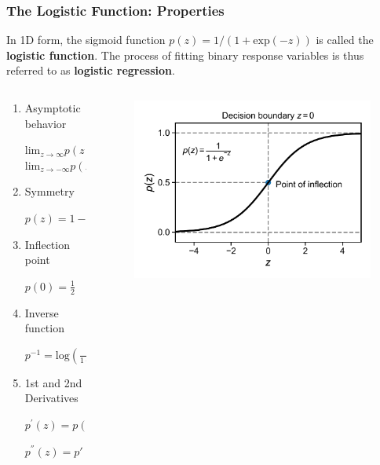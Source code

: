 \documentclass[10pt,aspectratio=169]{beamer}
\begin{document}
\begin{frame}
  \frametitle{The Logistic Function: Properties}
  
  In 1D form, the sigmoid function $p(z) = 1/(1 + \mathrm{exp}(-z))$ is called
  the \textbf{logistic function}. The process of fitting binary
  response variables is thus referred to as \textbf{logistic
    regression}.

    \begin{columns}[T]
      \begin{column}{0.5\textwidth}
        \begin{enumerate}
        \item Asymptotic behavior
          
          $\mathrm{lim}_{z\to\infty} p(z) = 1$ $\mathrm{lim}_{z\to-\infty} p(z) = 0$
          
        \item Symmetry

          $p(z) = 1 - p(1 -z)$
          
        \item Inflection point

          $p(0) = \frac{1}{2}$
          
        \item Inverse function

          $p^{-1} = \mathrm{log}(\frac{p}{1 - p})$

        \item 1st and 2nd Derivatives

          $p^{'}(z) = p(z)(1 - p(z))$

          $p^{''}(z) = p'(z)(1 - 2 p(z))$
        \end{enumerate}
      \end{column}

      \begin{column}{0.5\textwidth}

        \begin{figure}[t]
          \includegraphics[width=\textwidth]{scripts/logistic_fun_alone.pdf}
        \end{figure}
        

\end{column}
\end{columns}
\end{frame}
\end{document}
